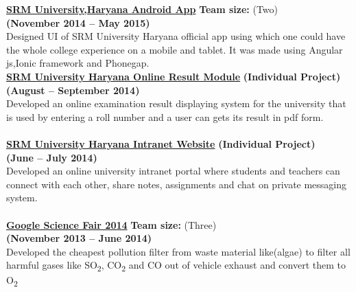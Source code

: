 \documentclass[margin,line]{res}
\begin{document}
\begin{resume}
{\bf \href{https://github.com/sagunesh/SRM-University-Android-App}{ SRM University,Haryana Android App}}\hfill  { \bf Team size: }{(Two)} \\{\bf (November 2014 -- May 2015)}\\
Designed UI of  SRM University Haryana official app using which one could have the whole college experience on a mobile and tablet. It was made using Angular js,Ionic framework and Phonegap.\\

{\bf \href{https://github.com/sagunesh/SRM-University-Management-System/tree/master/online-result-module}{ SRM University Haryana Online Result Module}} \hfill {\bf(Individual Project)}\\{\bf(August -- September 2014)}\\
Developed an online examination result displaying system for the university that is used  by entering a roll number and a user can gets its result in pdf form.\\\\

{\bf \href{https://github.com/sagunesh/SRM-University-Management-System}{SRM University Haryana Intranet Website}} \hfill {\bf(Individual Project)}\\{\bf(June -- July 2014)}\\
Developed an online university intranet portal where students and teachers can connect with each other, share notes, assignments and chat on  private messaging system. \\\\

{\bf  \href{https://drive.google.com/file/d/1xFzl_syoqi-URgJgDWmmM52WXdXly-XV/view}{Google Science Fair 2014}} \hfill{ \bf Team size: }{(Three)}\\{\bf(November 2013 -- June 2014)}\\
Developed the cheapest pollution filter from waste material like(algae) to filter all harmful gases like SO\textsubscript{2},  CO\textsubscript{2} and CO out of  vehicle exhaust and convert them to O\textsubscript{2}\\







\end{resume}
\end{document}

